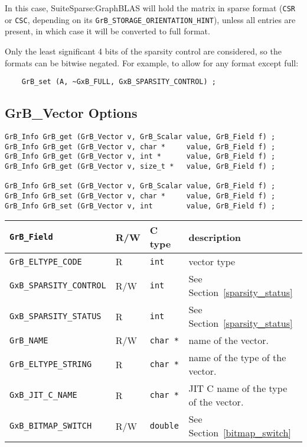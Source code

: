 In this case, SuiteSparse:GraphBLAS will hold the matrix in sparse format
(\verb'CSR' or \verb'CSC', depending on its
\verb'GrB_STORAGE_ORIENTATION_HINT'), unless all entries are present, in which
case it will be converted to full format.

Only the least significant 4 bits of the sparsity control are considered, so
the formats can be bitwise negated.  For example, to allow for any format
except full:

{\footnotesize
\begin{verbatim}
    GrB_set (A, ~GxB_FULL, GxB_SPARSITY_CONTROL) ; \end{verbatim}}

\newpage
\subsection{{\sf GrB\_Vector} Options}
\label{get_set_vector}

\begin{mdframed}[userdefinedwidth=6in]
{\footnotesize
\begin{verbatim}
GrB_Info GrB_get (GrB_Vector v, GrB_Scalar value, GrB_Field f) ;
GrB_Info GrB_get (GrB_Vector v, char *     value, GrB_Field f) ;
GrB_Info GrB_get (GrB_Vector v, int *      value, GrB_Field f) ;
GrB_Info GrB_get (GrB_Vector v, size_t *   value, GrB_Field f) ;

GrB_Info GrB_set (GrB_Vector v, GrB_Scalar value, GrB_Field f) ;
GrB_Info GrB_set (GrB_Vector v, char *     value, GrB_Field f) ;
GrB_Info GrB_set (GrB_Vector v, int        value, GrB_Field f) ;
\end{verbatim}
}\end{mdframed}

\noindent
{\small
\begin{tabular}{|l|l|l|p{3in}|}
\hline
\verb'GrB_Field'                    & R/W  & C type        & description \\
\hline
\verb'GrB_ELTYPE_CODE'              & R    & \verb'int'    & vector type \\
\verb'GxB_SPARSITY_CONTROL'         & R/W  & \verb'int'    & See Section~\ref{sparsity_status} \\
\verb'GxB_SPARSITY_STATUS'          & R    & \verb'int'    & See Section~\ref{sparsity_status} \\
\hline
\verb'GrB_NAME'                     & R/W  & \verb'char *' & name of the vector. \\
\verb'GrB_ELTYPE_STRING'            & R    & \verb'char *' & name of the type of the vector. \\
\verb'GxB_JIT_C_NAME'               & R    & \verb'char *' & JIT C name of the type of the vector. \\
\hline
\verb'GxB_BITMAP_SWITCH'            & R/W  & \verb'double' & See Section~\ref{bitmap_switch} \\
\hline
\end{tabular}
}

